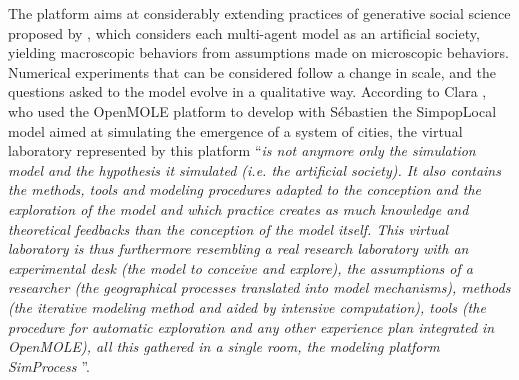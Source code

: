 \documentclass[10pt]{article}
\begin{document}
The platform aims at considerably extending practices of generative social science proposed by \cite{}, which considers each multi-agent model as an artificial society, yielding macroscopic behaviors from assumptions made on microscopic behaviors. Numerical experiments that can be considered follow a change in scale, and the questions asked to the model evolve in a qualitative way. According to Clara \cite{}, who used the OpenMOLE platform to develop with S{\'e}bastien \cite{} the SimpopLocal model aimed at simulating the emergence of a system of cities, the virtual laboratory represented by this platform ``\textit{is not anymore only the simulation model and the hypothesis it simulated (i.e. the artificial society). It also contains the methods, tools and modeling procedures adapted to the conception and the exploration of the model and which practice creates as much knowledge and theoretical feedbacks than the conception of the model itself. This virtual laboratory is thus furthermore resembling a real research laboratory with an experimental desk (the model to conceive and explore), the assumptions of a researcher (the geographical processes translated into model mechanisms), methods (the iterative modeling method and aided by intensive computation), tools (the procedure for automatic exploration and any other experience plan integrated in OpenMOLE), all this gathered in a single room, the modeling platform SimProcess \citep{}}''.
\end{document}

